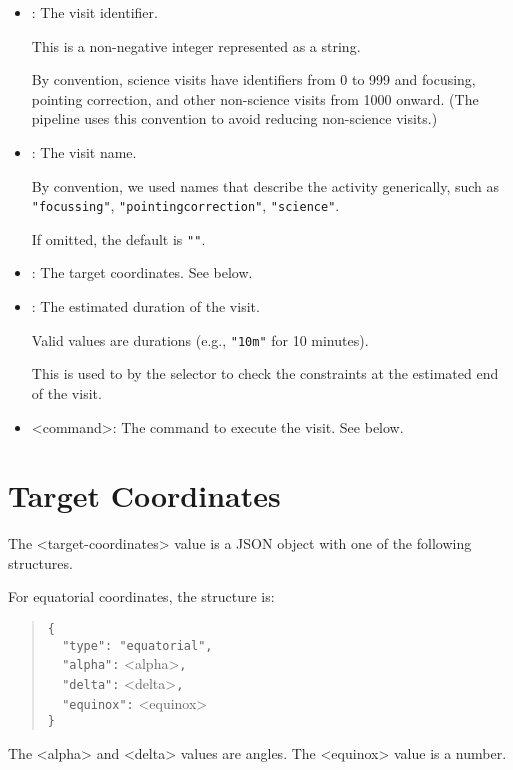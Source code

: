 \begin{itemize}
\item <visit-identifier>: The visit identifier.

This is a non-negative integer represented as a string.

By convention, science visits have identifiers from 0 to 999 and focusing, pointing correction, and other non-science visits from 1000 onward. (The pipeline uses this convention to avoid reducing non-science visits.)

\item <visit-name>: The visit name.

By convention, we used names that describe the activity generically, such as \verb|"focussing"|, \verb|"pointingcorrection"|, \verb|"science"|.

If omitted, the default is \verb|""|.

\item <target-coordinates>: The target coordinates. See below.

\item <estimated-duration>: The estimated duration of the visit.

Valid values are durations (e.g., \verb|"10m"| for 10 minutes).

This is used to by the selector to check the constraints at the estimated end of the visit.

\item <command>: The command to execute the visit. See below.

\end{itemize}

\section{Target Coordinates}

The <target-coordinates> value is a JSON object with one of the following structures.

For equatorial coordinates, the structure is:
\begin{quote}
\verb|{|\\
\verb|  "type": "equatorial",|\\
\verb|  "alpha":| <alpha>\verb|,|\\
\verb|  "delta":| <delta>\verb|,|\\
\verb|  "equinox":| <equinox>\\
\verb|}|
\end{quote}

The <alpha> and <delta> values are angles. The <equinox> value is a number.

